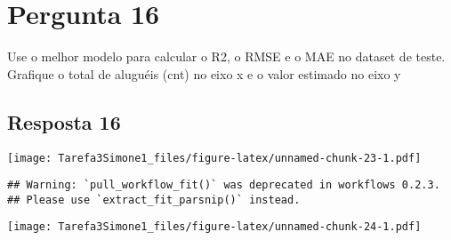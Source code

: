 \documentclass[
]{article}
\begin{document}
\hypertarget{pergunta-16}{%
\section{Pergunta 16}\label{pergunta-16}}

Use o melhor modelo para calcular o R2, o RMSE e o MAE no dataset de
teste. Grafique o total de aluguéis (cnt) no eixo x e o valor estimado
no eixo y

\hypertarget{resposta-16}{%
\subsection{Resposta 16}\label{resposta-16}}

\texttt{[image: Tarefa3Simone1\_files/figure-latex/unnamed-chunk-23-1.pdf]}

\begin{verbatim}
## Warning: `pull_workflow_fit()` was deprecated in workflows 0.2.3.
## Please use `extract_fit_parsnip()` instead.
\end{verbatim}

\texttt{[image: Tarefa3Simone1\_files/figure-latex/unnamed-chunk-24-1.pdf]}
\end{document}
